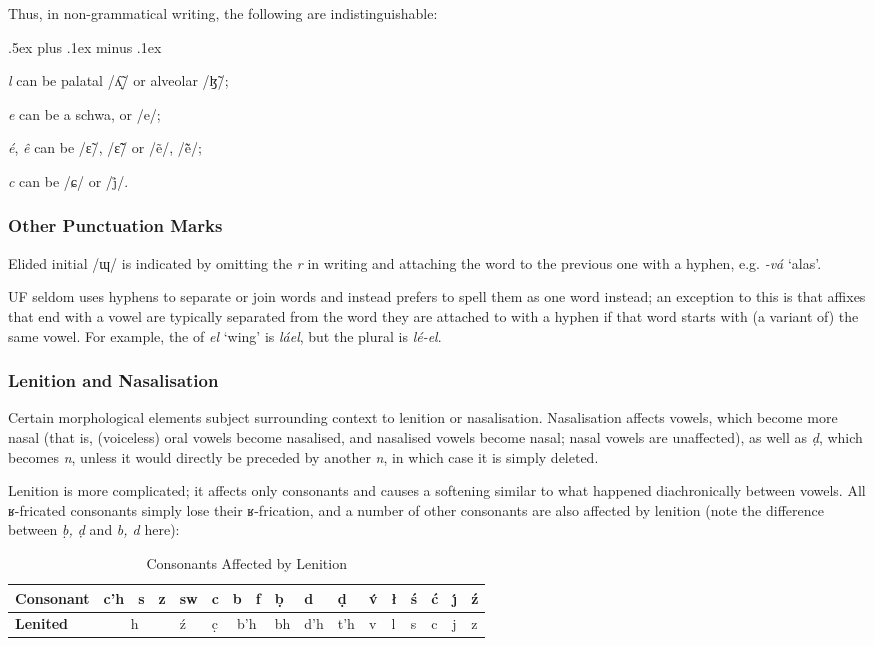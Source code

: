 \documentclass[a4paper, 12pt, twoside, final]{article}
\let \nf \normalfont
\let \w \textit
\begin{document}
\noindent Thus, in non-grammatical writing, the following are indistinguishable:
\begin{items}\itemsep .5ex plus .1ex minus .1ex\relax
\item \w{l} can be palatal /ʎ̝̃/ or alveolar /ɮ̃/;
\item \w{e} can be a schwa, or /e/;
\item \w{é}, \w{ê} can be /ɛ̃/, /ɛ̃̃/ or /ẽ/, /ẽ̃/;
\item \w{c} can be /ɕ/ or /j̊/.
\end{items}

\subsubsection{Other Punctuation Marks}
\noindent Elided initial /ɰ/ is indicated by omitting the \w{r} in writing and attaching the word to the previous one with a hyphen,
e.g. \w{-vá} ‘alas’.

UF seldom uses hyphens to separate or join words and instead prefers to spell them as one word instead; an exception
to this is that affixes that end with a vowel are typically separated from the word they are attached to with a hyphen
if that word starts with (a variant of) the same vowel. For example, the  of \w{el} ‘wing’
is \w{láel}, but the plural is \w{lé-el}.

\subsubsection{Lenition and Nasalisation}
Certain morphological elements subject surrounding context to lenition or nasalisation. Nasalisation affects vowels,
which become more nasal (that is, (voiceless) oral vowels become nasalised, and nasalised vowels become nasal; nasal
vowels are unaffected), as well as \w{ḍ}, which becomes \w{n}, unless it would directly be preceded by another \w{n}, in
which case it is simply deleted.

Lenition is more complicated; it affects only consonants and causes a softening similar to what happened diachronically
between vowels. All ʁ-fricated consonants simply lose their ʁ-frication, and a number of other consonants are also
affected by lenition (note the difference between \w{ḅ, ḍ} and \w{b, d} here):

\begin{table}[H]
\centering
\itshape
\begin{tabular}{l|lll|l|l|ll|l|l|l|l|l|l|l|l|l|}
\bf Consonant & c’h & s & z & sw     & c & b & f                        & ḅ   & d   & ḍ   & v́ & ł & ś & ć & ȷ́ & ź  \\\hline
\bf Lenited & \multicolumn{3}{c|}{h} & ź & c̣ & \multicolumn{2}{c|}{b’h} & bh  & d’h & t’h & v & l & s & c & j & z \\
\end{tabular}
\nf
\caption{Consonants Affected by Lenition}\label{tab:lenition}
\end{table}
\end{document}

